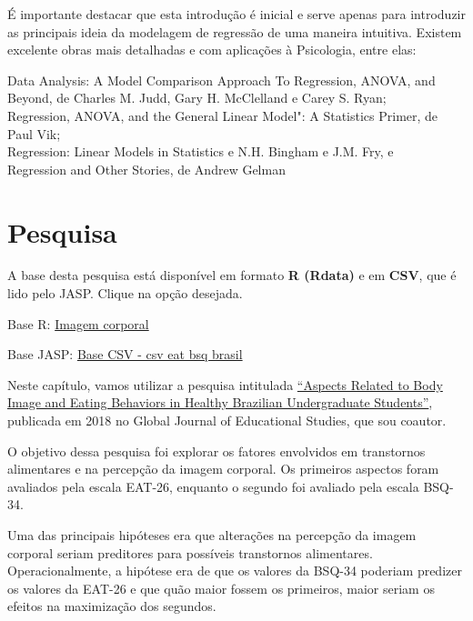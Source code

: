 \documentclass[
]{book}
\begin{document}
É importante destacar que esta introdução é inicial e serve apenas para
introduzir as principais ideia da modelagem de regressão de uma maneira
intuitiva. Existem excelente obras mais detalhadas e com aplicações à
Psicologia, entre elas:

Data Analysis: A Model Comparison Approach To Regression, ANOVA, and
Beyond, de Charles M. Judd, Gary H. McClelland e Carey S. Ryan;\\
Regression, ANOVA, and the General Linear Model": A Statistics Primer,
de Paul Vik;\\
Regression: Linear Models in Statistics e N.H. Bingham e J.M. Fry, e\\
Regression and Other Stories, de Andrew Gelman

\hypertarget{pesquisa-8}{%
\section{Pesquisa}\label{pesquisa-8}}

\begin{base}

A base desta pesquisa está disponível em formato \textbf{R (Rdata)} e em
\textbf{CSV}, que é lido pelo JASP. Clique na opção desejada.

Base R:
\href{https://github.com/anovabr/mqt/raw/master/bases/Base\%20R\%20-\%20imagem\%20corporal.RData}{Imagem
corporal}

Base JASP:
\href{https://github.com/anovabr/mqt/raw/master/bases/bases_csv_jasp.zip}{Base
CSV - csv eat bsq brasil}

\end{base}

Neste capítulo, vamos utilizar a pesquisa intitulada
\href{https://www.researchgate.net/publication/323729370_Aspects_Related_to_Body_Image_and_Eating_Behaviors_in_Healthy_Brazilian_Undergraduate_Students}{``Aspects
Related to Body Image and Eating Behaviors in Healthy Brazilian
Undergraduate Students''}, publicada em 2018 no Global Journal of
Educational Studies, que sou coautor.

O objetivo dessa pesquisa foi explorar os fatores envolvidos em
transtornos alimentares e na percepção da imagem corporal. Os primeiros
aspectos foram avaliados pela escala EAT-26, enquanto o segundo foi
avaliado pela escala BSQ-34.

Uma das principais hipóteses era que alterações na percepção da imagem
corporal seriam preditores para possíveis transtornos alimentares.
Operacionalmente, a hipótese era de que os valores da BSQ-34 poderiam
predizer os valores da EAT-26 e que quão maior fossem os primeiros,
maior seriam os efeitos na maximização dos segundos.
\end{document}
